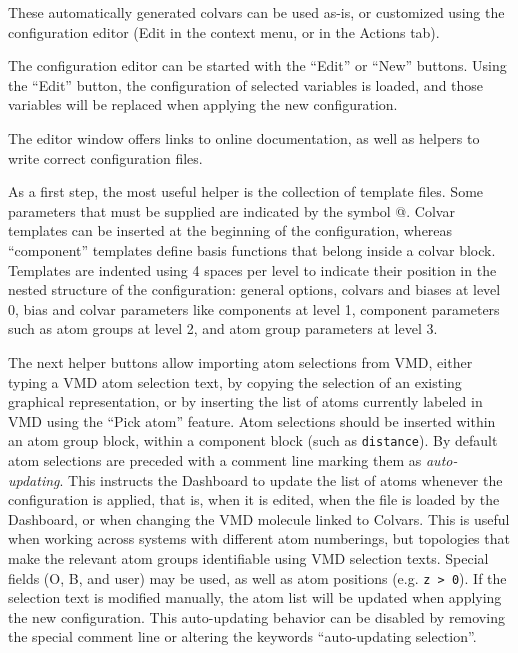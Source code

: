 {These automatically generated colvars can be used as-is, or customized using the configuration editor (Edit in the context menu, or in the Actions tab).



The configuration editor can be started with the ``Edit'' or ``New'' buttons.
Using the ``Edit'' button, the configuration of selected variables is loaded, and those variables will be replaced when applying the new configuration.

The editor window offers links to online documentation, as well as helpers to write correct configuration files.

As a first step, the most useful helper is the collection of template files.
Some parameters that must be supplied are indicated by the symbol @.
Colvar templates can be inserted at the beginning of the configuration, whereas ``component'' templates define basis functions that belong inside a colvar block.
Templates are indented using 4 spaces per level to indicate their position in the nested structure of the configuration: general options, colvars and biases at level 0,
bias and colvar parameters like components at level 1, component parameters such as atom groups at level 2, and atom group parameters at level 3.

The next helper buttons allow importing atom selections from VMD, either typing a VMD atom selection text, by copying the selection of an existing graphical representation, or by inserting the list of atoms currently labeled in VMD using the ``Pick atom'' feature.
Atom selections should be inserted within an atom group block, within a component block (such as \texttt{distance}).
By default atom selections are preceded with a comment line marking them as \emph{auto-updating}.
This instructs the Dashboard to update the list of atoms whenever the configuration is applied, that is, when it is edited, when the file is loaded by the Dashboard, or when changing the VMD molecule linked to Colvars.
This is useful when working across systems with different atom numberings, but topologies that make the relevant atom groups identifiable using VMD selection texts.
Special fields (O, B, and user) may be used, as well as atom positions (e.g. \texttt{z > 0}).
If the selection text is modified manually, the atom list will be updated when applying the new configuration.
This auto-updating behavior can be disabled by removing the special comment line or altering the keywords ``auto-updating selection''.

}
